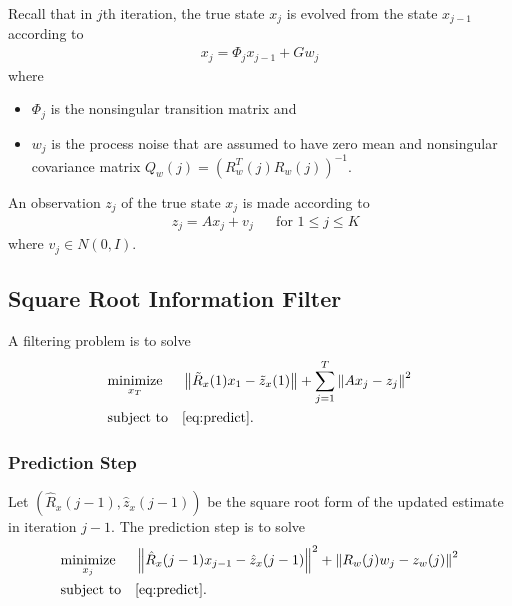 \documentclass[microtype]{gtpart}     %
\theoremstyle{definition}
\newcommand{\norm}[1]{\left\lVert#1\right\rVert}
\begin{document}
Recall that in $j$th iteration, the true state $x_j$ is evolved from the state $x_{j-1}$ according to
\begin{align}
x_j = \Phi_j x_{j-1} + Gw_j \label{eq:predict}
\end{align}
where
\begin{itemize}
	\item $\Phi_j$ is the nonsingular transition matrix and
	\item $w_j$ is the process noise that are assumed to have zero mean and nonsingular covariance matrix 
	$Q_w(j)=(R^T_w(j)R_w(j))^{-1}$.
\end{itemize}
An observation $z_j$ of the true state $x_j$ is made according to
\begin{align*}
	&z_j = A x_j + v_j & &\text{for } 1\leq j \leq K
\end{align*}
where $v_j \in N(0, I)$.

\subsection{Square Root Information Filter}

A filtering problem is to solve
\begin{align*}
& \underset{x_T}{\text{minimize}} & & \norm{\tilde{R}_x(1)x_1 - \tilde{z}_x(1)} + \sum_{j=1}^{T}\norm{Ax_j - z_j}^2 \\
& \text{subject to} & & \autoref{eq:predict}.
\end{align*}

\subsubsection{Prediction Step}

Let $(\hat{R}_x(j-1), \hat{z}_x(j-1))$ be the square root form of the updated estimate in iteration $j-1$.
The prediction step is to solve
\begin{align*}
	& \underset{x_j}{\text{minimize}} & &\norm{\hat{R}_x(j-1)x_{j-1} - \hat{z}_x(j-1)}^2 + \norm{R_w(j)w_j - z_w(j)}^2 \\
	& \text{subject to} & & \autoref{eq:predict}.
\end{align*}
\end{document}
